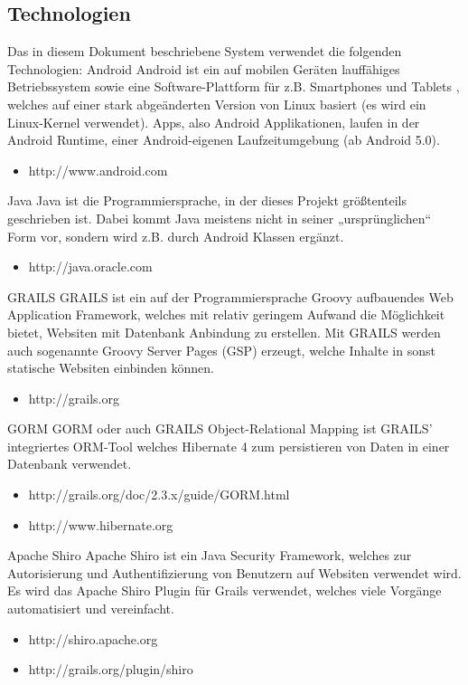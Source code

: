 \subsection{Technologien}
Das in diesem Dokument beschriebene System verwendet die folgenden Technologien:
Android
Android ist ein auf mobilen Ger\"aten lauff\"ahiges Betriebssystem sowie eine Software-Plattform f\"ur z.B. Smartphones und Tablets , welches auf einer stark abgeänderten Version von Linux basiert (es wird ein Linux-Kernel verwendet). Apps, also Android Applikationen, laufen in der Android Runtime, einer Android-eigenen Laufzeitumgebung (ab Android 5.0).
\begin{itemize}
\item http://www.android.com
\end{itemize}
Java
Java ist die Programmiersprache, in der dieses Projekt größtenteils geschrieben ist. Dabei kommt Java meistens nicht in seiner „urspr\"unglichen“ Form vor, sondern wird z.B. durch Android Klassen ergänzt.
\begin{itemize}
\item http://java.oracle.com
\end{itemize}
GRAILS
GRAILS ist ein auf der Programmiersprache Groovy aufbauendes Web Application Framework, welches mit relativ geringem Aufwand die Möglichkeit bietet, Websiten mit Datenbank Anbindung zu erstellen. Mit GRAILS werden auch sogenannte Groovy Server Pages (GSP) erzeugt, welche Inhalte in sonst statische Websiten einbinden können.
\begin{itemize}
\item http://grails.org
\end{itemize}
GORM
GORM oder auch GRAILS Object-Relational Mapping ist GRAILS' integriertes ORM-Tool welches Hibernate 4 zum persistieren von Daten in einer Datenbank verwendet.
\begin{itemize}
\item http://grails.org/doc/2.3.x/guide/GORM.html
\item http://www.hibernate.org
\end{itemize}
Apache Shiro
Apache Shiro ist ein Java Security Framework, welches zur Autorisierung und Authentifizierung von Benutzern auf Websiten verwendet wird. Es wird das Apache Shiro Plugin für Grails verwendet, welches viele Vorgänge automatisiert und vereinfacht.
\begin{itemize}
\item http://shiro.apache.org
\item http://grails.org/plugin/shiro
\end{itemize}
